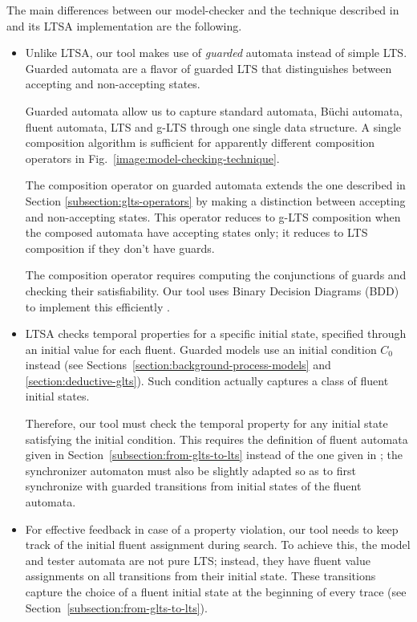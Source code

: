 The main differences between our model-checker and the technique described in \cite{Giannakopoulou:2003} and its LTSA implementation are the following.
\begin{itemize}

\item Unlike LTSA, our tool makes use of \emph{guarded} automata instead of simple LTS. Guarded automata are a flavor of guarded LTS that distinguishes between accepting and non-accepting states. 

Guarded automata allow us to capture standard automata, B\"uchi automata, fluent automata, LTS and g-LTS through one single data structure. A single composition algorithm is sufficient for apparently different composition operators in Fig.~\ref{image:model-checking-technique}. 

The composition operator on guarded automata extends the one described in Section \ref{subsection:glts-operators} by making a distinction between accepting and non-accepting states. This operator reduces to g-LTS composition when the composed automata have accepting states only; it reduces to LTS composition if they don't have guards. 

The composition operator requires computing the conjunctions of guards and checking their satisfiability. Our tool uses Binary Decision Diagrams (BDD) to implement this efficiently \cite{Bryant:1986}. 

\item LTSA checks temporal properties for a specific initial state, specified through an initial value for each fluent. Guarded models use an initial condition $C_0$ instead (see Sections~\ref{section:background-process-models} and \ref{section:deductive-glts}). Such condition actually captures a class of fluent initial states. 

Therefore, our tool must check the temporal property for any initial state satisfying the initial condition. This requires the definition of fluent automata given in Section~\ref{subsection:from-glts-to-lts} instead of the one given in \cite{Giannakopoulou:2003}; the synchronizer automaton must also be slightly adapted so as to first synchronize with guarded transitions from initial states of the fluent automata.

\item For effective feedback in case of a property violation, our tool needs to keep track of the initial fluent assignment during search. To achieve this, the model and tester automata are not pure LTS; instead, they have fluent value assignments on all transitions from their initial state. These transitions capture the choice of a fluent initial state at the beginning of every trace (see Section~\ref{subsection:from-glts-to-lts}). 

\end{itemize}


